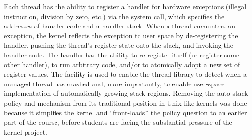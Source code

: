 Each thread has the ability to register a handler
for hardware exceptions (illegal instruction,
division by zero, etc.)
via the  system call,
which specifies the addresses of handler code
and a handler stack.
When a thread encounters an exception,
the kernel reflects the exception to user space
by
de-registering the handler,
pushing the thread's register state onto the stack,
and invoking the handler code.
The handler has the ability to re-register itself
(or register some other handler),
to run arbitrary code,
and/or to atomically adopt a new set of register
values.
The  facility is used to enable
the thread library to detect when a managed
thread has crashed
and, more importantly,
to enable user-space
implementation of automatically-growing stack
regions.
Removing the auto-stack policy and mechanism from
its traditional position in Unix-like kernels
was done because it simplfies the kernel and
``front-loads'' the policy question to an earlier
part of the course,
before students are facing the substantial pressure
of the kernel project.
